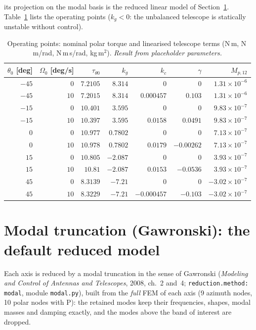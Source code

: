 \documentclass[10pt,a4paper]{article}
\numberwithin{equation}{section}
\begin{document}
its projection on the modal basis is the reduced linear model of Section~\ref{sec:modal}. Table~\ref{tab:op} lists the operating points ($k_g < 0$: the unbalanced telescope is statically unstable without control).
\begin{table}[H]\centering\small
\caption{Operating points: nominal polar torque and linearised telescope terms (N\,m, N\,m/rad, N\,m\,s/rad, kg\,m$^2$). \emph{Result from placeholder parameters.}}\label{tab:op}
\begin{tabular}{rrrrrrr}\toprule
$\theta_0$ [deg] & $\Omega_0$ [deg/s] & $\tau_{\theta0}$ & $k_g$ & $k_c$ & $\gamma$ & $M_{p,12}$ \\ \midrule
$-45$ & $0$ & $7.2105$ & $8.314$ & $0$ & $0$ & $1.31\times10^{-6}$ \\
$-45$ & $10$ & $7.2015$ & $8.314$ & $0.000457$ & $0.103$ & $1.31\times10^{-6}$ \\
$-15$ & $0$ & $10.401$ & $3.595$ & $0$ & $0$ & $9.83\times10^{-7}$ \\
$-15$ & $10$ & $10.397$ & $3.595$ & $0.0158$ & $0.0491$ & $9.83\times10^{-7}$ \\
$0$ & $0$ & $10.977$ & $0.7802$ & $0$ & $0$ & $7.13\times10^{-7}$ \\
$0$ & $10$ & $10.978$ & $0.7802$ & $0.0179$ & $-0.00262$ & $7.13\times10^{-7}$ \\
$15$ & $0$ & $10.805$ & $-2.087$ & $0$ & $0$ & $3.93\times10^{-7}$ \\
$15$ & $10$ & $10.81$ & $-2.087$ & $0.0153$ & $-0.0536$ & $3.93\times10^{-7}$ \\
$45$ & $0$ & $8.3139$ & $-7.21$ & $0$ & $0$ & $-3.02\times10^{-7}$ \\
$45$ & $10$ & $8.3229$ & $-7.21$ & $-0.000457$ & $-0.103$ & $-3.02\times10^{-7}$ \\
\bottomrule\end{tabular}\end{table}
\section{Modal truncation (Gawronski): the default reduced model}\label{sec:modal}
Each axis is reduced by a modal truncation in the sense of Gawronski (\emph{Modeling and Control of Antennas and Telescopes}, 2008, ch.~2 and~4; \texttt{reduction.method: modal}, module \texttt{modal.py}), built from the \emph{full} FEM of each axis (9 azimuth nodes, 10 polar nodes with P): the retained modes keep their frequencies, shapes, modal masses and damping exactly, and the modes above the band of interest are dropped.
\end{document}
